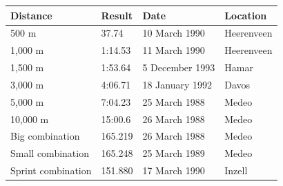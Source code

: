\documentclass{article}
\begin{document}
\begin{tabular}{llll}
\toprule
Distance & Result & Date & Location \\
\midrule
500 m & 37.74 & 10 March 1990 & Heerenveen \\
1,000 m & 1:14.53 & 11 March 1990 & Heerenveen \\
1,500 m & 1:53.64 & 5 December 1993 & Hamar \\
3,000 m & 4:06.71 & 18 January 1992 & Davos \\
5,000 m & 7:04.23 & 25 March 1988 & Medeo \\
10,000 m & 15:00.6 & 26 March 1988 & Medeo \\
Big combination & 165.219 & 26 March 1988 & Medeo \\
Small combination & 165.248 & 25 March 1989 & Medeo \\
Sprint combination & 151.880 & 17 March 1990 & Inzell \\
\bottomrule
\end{tabular}
\end{document}
